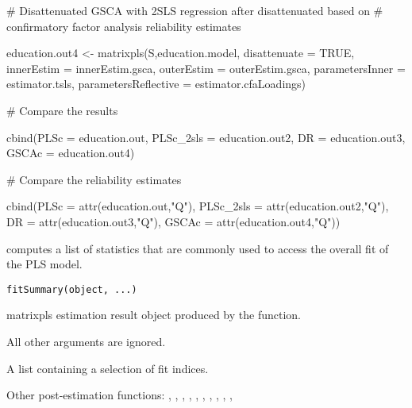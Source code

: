 \documentclass[a4paper]{book}
\begin{document}
\begin{Examples}
\begin{ExampleCode}
# Disattenuated GSCA with 2SLS regression after disattenuated based on 
# confirmatory factor analysis reliability estimates


education.out4 <- matrixpls(S,education.model,
                       disattenuate = TRUE,
                       innerEstim = innerEstim.gsca,
                       outerEstim = outerEstim.gsca,
                       parametersInner = estimator.tsls,
                       parametersReflective = estimator.cfaLoadings)


# Compare the results

cbind(PLSc = education.out, PLSc_2sls = education.out2, 
      DR = education.out3, GSCAc = education.out4)

# Compare the reliability estimates

cbind(PLSc = attr(education.out,"Q"), PLSc_2sls = attr(education.out2,"Q"), 
      DR = attr(education.out3,"Q"), GSCAc = attr(education.out4,"Q"))
\end{ExampleCode}
\end{Examples}
%
\begin{Description}\relax
{} computes a list of statistics
that are commonly used to access the overall fit of the PLS model.
\end{Description}
%
\begin{Usage}
\begin{verbatim}
fitSummary(object, ...)
\end{verbatim}
\end{Usage}
%
\begin{Arguments}
\begin{ldescription}
\item[\code{object}] matrixpls estimation result object produced by the  function.

\item[\code{...}] All other arguments are ignored.
\end{ldescription}
\end{Arguments}
%
\begin{Value}
A list containing a selection of fit indices.
\end{Value}
%
\begin{SeeAlso}\relax
Other post-estimation functions: 
,
,
,
,
,
,
,
,
,
,
\end{SeeAlso}
\end{document}

